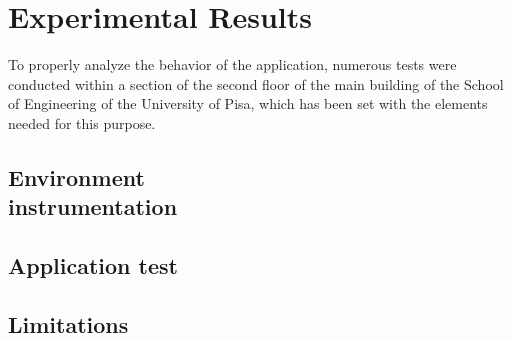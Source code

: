 \section{Experimental Results}
\label{sec:experimental_results}
To properly analyze the behavior of the application, numerous tests were conducted within a section of the second floor of the main building of the School of Engineering of the University of Pisa, which has been set with the elements needed for this purpose.

\subsection{Environment\\ instrumentation}


\subsection{Application test}


\subsection{Limitations}

